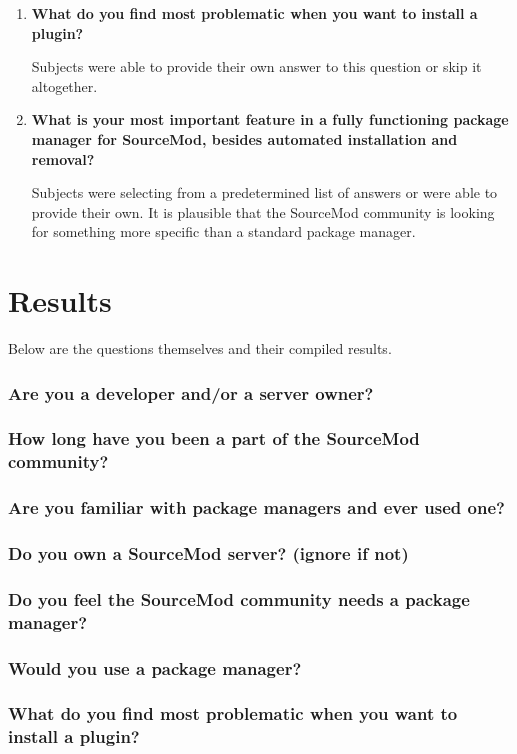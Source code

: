 \begin{enumerate}
    \item \textbf{What do you find most problematic when you want to install a plugin?}

    Subjects were able to provide their own answer to this question or skip it altogether.

    \item \textbf{What is your most important feature in a fully functioning package manager for SourceMod, besides automated installation and removal?}

    Subjects were selecting from a predetermined list of answers or were able to provide their own.
    It is plausible that the SourceMod community is looking for something more specific than a standard package manager.
\end{enumerate}

\section{Results}

Below are the questions themselves and their compiled results.

\subsubsection{Are you a developer and/or a server owner?}

\subsubsection{How long have you been a part of the SourceMod community?}

\subsubsection{Are you familiar with package managers and ever used one?}

\subsubsection{Do you own a SourceMod server? (ignore if not)}

\subsubsection{Do you feel the SourceMod community needs a package manager?}

\subsubsection{Would you use a package manager?}

\subsubsection{What do you find most problematic when you want to install a plugin?}
